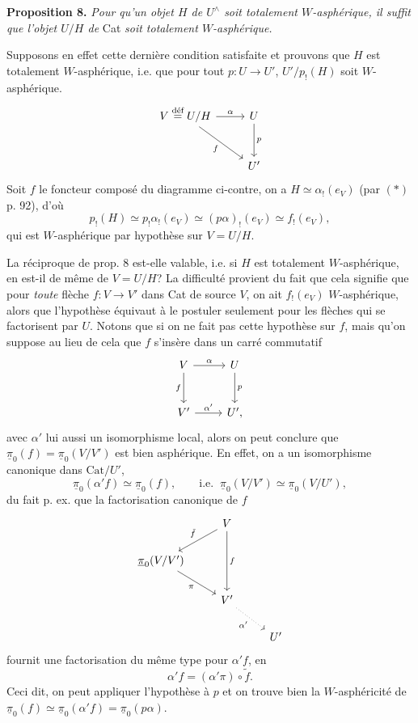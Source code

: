 \documentclass[11pt]{article}
\newcommand{\printedpage}[1]{\marginpar{\footnotesize p.~#1}}
\newcommand{\msp}[1]{\marginpar{\footnotesize [#1]}}
\newcommand{\Cat}{\mathrm{Cat}}
\newcommand{\defeq}{\overset{\text{déf}}{=}}
\newcommand{\upi}{\underline{\pi}}
\begin{document}
\textbf{Proposition 8.} \textit{Pour qu'un objet $H$ de $U^{\wedge}$ soit totalement $W$-asphérique, il suffit que l'objet $U/H$ de} Cat \textit{soit totalement $W$-asphérique.}

\msp{page 94}
Supposons en effet cette dernière condition satisfaite et prouvons que $H$ est totalement $W$-asphérique, i.e. que pour tout $p : U \longrightarrow U'$, $U'/p_!(H)$ soit $W$-asphérique.
\[
\begin{tikzcd}[row sep=large]
V \defeq U/H \arrow[r, "\alpha"] \arrow[dr, "f"'] & U \arrow[d, "p"] \\
 & U'
\end{tikzcd}
\]
Soit $f$ le foncteur composé du diagramme ci-contre, on a $H \simeq \alpha_!(e_V)$ (par $(*)$ p. 92), d'où
\[ p_!(H) \simeq p_!\alpha_!(e_V) \simeq (p\alpha)_!(e_V) \simeq f_!(e_V), \]
qui est $W$-asphérique par hypothèse sur $V = U/H$.

La réciproque de prop. 8 est-elle valable, i.e. si $H$ est totalement $W$-asphérique, en est-il de même de $V = U/H$? La difficulté provient du fait que cela signifie que pour \textit{toute} flèche $f : V \longrightarrow V'$ dans Cat de source $V$, on ait $f_!(e_V)$ $W$-asphérique, alors que l'hypothèse équivaut à le postuler seulement pour les flèches qui se factorisent par $U$. Notons que si on ne fait pas cette hypothèse sur $f$, mais qu'on suppose au lieu de cela que $f$ s'insère dans un carré commutatif \msp{page 95}
\[
\begin{tikzcd}[row sep=large]
V \arrow[r, "\alpha"] \arrow[d, "f"'] & U \arrow[d, "p"] \\
V' \arrow[r, "\alpha'"] & U',
\end{tikzcd}
\]
avec $\alpha'$ lui aussi un isomorphisme local, alors on peut conclure que $\upi_0(f) = \upi_0(V/V')$ est bien asphérique. En effet, on a un isomorphisme canonique dans $\Cat/U'$,
\[ \upi_0(\alpha'f) \simeq \upi_0(f), \qquad \text{i.e. } \ \upi_0(V/V') \simeq \upi_0(V/U'), \]
du fait p. ex. que la factorisation canonique de $f$
\printedpage{67}
\[
\begin{tikzcd}[row sep=normal]
 & V \arrow[dl, "\tilde{f}"'] \arrow[dd, "f"] & \\
\upi_0(V/V') \arrow[dr, "\pi"'] & & \\
 & V' \arrow[dr, dotted, "\alpha'"'] & \\
 & & U'
\end{tikzcd}
\]
fournit une factorisation du même type pour $\alpha'f$, en
\[ \alpha'f = (\alpha'\pi) \circ \tilde{f}. \]
Ceci dit, on peut appliquer l'hypothèse à $p$ et on trouve bien la $W$-asphéricité de $\upi_0(f) \simeq \upi_0(\alpha'f) = \upi_0(p\alpha)$.
\end{document}
